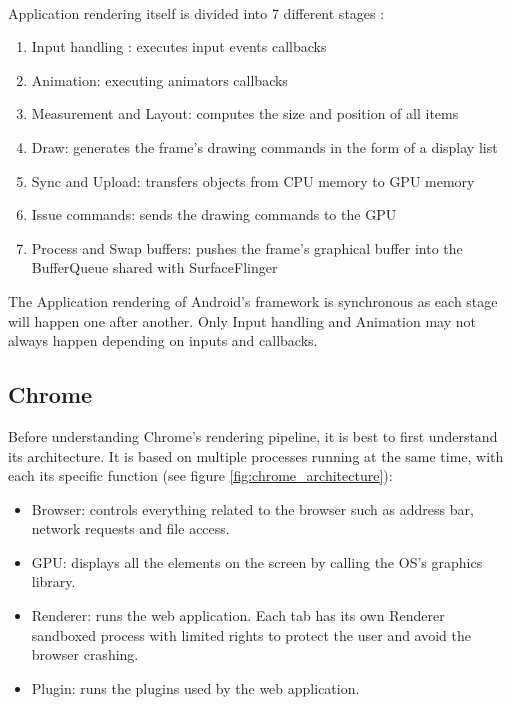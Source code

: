 \documentclass{kththesis}
\begin{document}
\paragraph{}
Application rendering itself is divided into 7 different stages \cite{app_rendering}:
\begin{enumerate}
    \item Input handling : executes input events callbacks
    \item Animation: executing animators callbacks
    \item Measurement and Layout: computes the size and position of all items
    \item Draw: generates the frame's drawing commands in the form of a display list
    \item Sync and Upload: transfers objects from CPU memory to GPU memory
    \item Issue commands: sends the drawing commands to the GPU
    \item Process and Swap buffers: pushes the frame's graphical buffer into the BufferQueue shared with SurfaceFlinger
\end{enumerate}

The Application rendering of Android's framework is synchronous as each stage will happen one after another. Only Input handling and Animation may not always happen depending on inputs and callbacks.

\subsection{Chrome}
Before understanding Chrome's rendering pipeline, it is best to first understand its architecture. It is based on multiple processes running at the same time, with each its specific function \cite{chrome_architecture} (see figure \ref{fig:chrome_architecture}):
\begin{itemize}
    \item Browser: controls everything related to the browser such as address bar, network requests and file access.
    \item GPU: displays all the elements on the screen by calling the OS's graphics library.
    \item Renderer: runs the web application. Each tab has its own Renderer sandboxed process with limited rights to protect the user and avoid the browser crashing.
    \item Plugin: runs the plugins used by the web application.
\end{itemize}
\end{document}
